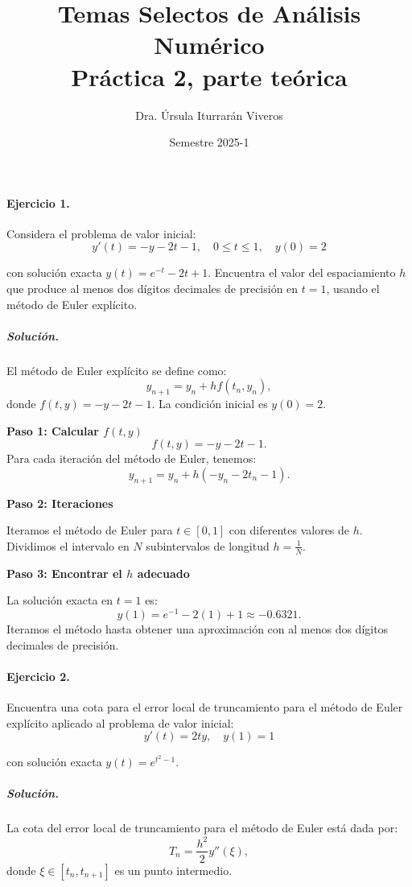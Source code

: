 \documentclass[12pt,letterpaper,oneside]{article}
\title{Temas Selectos de Análisis Numérico\\Práctica 2, parte teórica}
\author{Dra. Úrsula Iturrarán Viveros}
\date{Semestre 2025-1}
\begin{document}
\maketitle

\paragraph*{Ejercicio 1.} Considera el problema de valor inicial:
\begin{equation}
y'(t) = -y-2t-1,\quad 0\leq t\leq 1,\quad y(0) = 2 \label{eq-1}
\end{equation}

\noindent con solución exacta $y(t) = e^{-t} - 2t + 1$. Encuentra el valor del espaciamiento $h$ que produce al menos dos dígitos decimales de precisión en $t=1$, usando el método de Euler explícito.

\subparagraph*{Solución.}

El método de Euler explícito se define como:
\[
y_{n+1} = y_n + h f(t_n, y_n),
\]
donde $f(t, y) = -y - 2t - 1$. La condición inicial es $y(0) = 2$.

\textbf{Paso 1: Calcular $f(t, y)$}
\[
f(t, y) = -y - 2t - 1.
\]
Para cada iteración del método de Euler, tenemos:
\[
y_{n+1} = y_n + h(-y_n - 2t_n - 1).
\]

\textbf{Paso 2: Iteraciones}

Iteramos el método de Euler para $t \in [0, 1]$ con diferentes valores de $h$. Dividimos el intervalo en $N$ subintervalos de longitud $h = \frac{1}{N}$.

\textbf{Paso 3: Encontrar el $h$ adecuado}

La solución exacta en $t=1$ es:
\[
y(1) = e^{-1} - 2(1) + 1 \approx -0.6321.
\]
Iteramos el método hasta obtener una aproximación con al menos dos dígitos decimales de precisión.

\paragraph*{Ejercicio 2.} Encuentra una cota para el error local de truncamiento para el método de Euler explícito aplicado al problema de valor inicial:
\begin{equation}
y'(t) = 2ty,\quad y(1) = 1 \label{eq-2}
\end{equation}

\noindent con solución exacta $y(t)=e^{t^2-1}$.

\subparagraph*{Solución.}

La cota del error local de truncamiento para el método de Euler está dada por:
\[
T_n = \frac{h^2}{2} y''(\xi),
\]
donde $\xi \in [t_n, t_{n+1}]$ es un punto intermedio.
\end{document}
